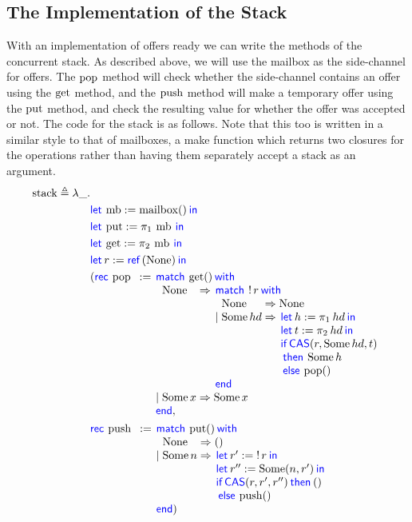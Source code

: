 \subsection{The Implementation of the Stack}
With an implementation of offers ready we can write the methods of the concurrent stack.
As described above, we will use the mailbox as the side-channel for offers.
The $\operatorname{pop}$ method will check whether the side-channel contains an offer using the $\operatorname{get}$ method, and the $\operatorname{push}$ method will make a temporary offer using the $\operatorname{put}$ method, and check the resulting value for whether the offer was accepted or not.
The code for the stack is as follows.
Note that this too is written in a similar style to that of mailboxes, a make function which returns two closures for the operations rather than having them separately accept a stack as an argument.
\newcommand{\stack}{\ensuremath{\operatorname{stack}}}
\begin{align*}
  \stack \eqdef \lambda \_.&\\
               &\Let \operatorname{mb} = \mailbox () in\\
               &\Let \mbput = \Proj{1}\operatorname{mb} in\\
               &\Let \mbget = \Proj{2} \operatorname{mb} in\\
               &\Let r = \Ref(\None) in\\
  &(
    \Rec{\popS} = \MatchML{\mbget ()}with{\None}=>{\MatchML{\deref r}with{\None}=>{\None}|{\Some hd}=>{\begin{array}[t]{l}
                                                                                                         \Let h = \Proj{1} hd in\\
                                                                                                         \Let t = \Proj{2} hd in\\
                                                                                                         \If \CAS(r,\Some hd,t)\\  then \Some h\\ \Else \popS \TT\end{array}}end{}}|{\Some x}=>{\Some x}end{,}\\
  &\Rec{\pushS} = 
    \MatchML{\mbput \TT}with{\None}=>{\TT}|{\Some n}=>{\begin{array}[t]{l}
                                                         \Let r' = \deref r in\\
                                                         \Let r'' = \Some (n, r') in\\
                                                         \If \CAS(r, r', r'') then \TT\\
                                                         \Else \pushS \TT
                                                       \end{array}}end{)}
\end{align*}

